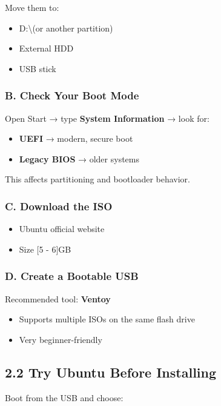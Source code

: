 \documentclass[12pt]{article}
\begin{document}
Move them to:

\begin{itemize}
    \item D:\textbackslash (or another partition)
    \item External HDD
    \item USB stick
\end{itemize}

\subsubsection*{B. Check Your Boot Mode}

Open Start → type \textbf{System Information} → look for:

\begin{itemize}
    \item \textbf{UEFI} → modern, secure boot
    \item \textbf{Legacy BIOS} → older systems
\end{itemize}

This affects partitioning and bootloader behavior.

\subsubsection*{C. Download the ISO}

\begin{itemize}
    \item Ubuntu official website
    \item Size [5 - 6]GB
\end{itemize}

\subsubsection*{D. Create a Bootable USB}

Recommended tool: \textbf{Ventoy}

\begin{itemize}
    \item Supports multiple ISOs on the same flash drive
    \item Very beginner-friendly
\end{itemize}

\subsection*{2.2 Try Ubuntu Before Installing}

Boot from the USB and choose:
\end{document}
